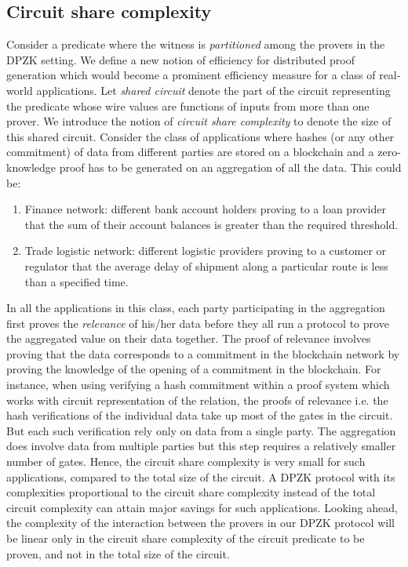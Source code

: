 \subsection{Circuit share complexity}
Consider a predicate where the witness is \textit{partitioned} among the provers in the DPZK setting. We define a new notion of efficiency for distributed proof generation which would become a prominent efficiency measure for a class of real-world applications.
Let \textit{shared circuit} denote the part of the circuit representing the predicate whose wire values are functions of inputs from more than one prover. 
We introduce the notion of \textit{circuit share complexity} to denote the size of this shared circuit.
Consider the class of applications where hashes (or any other commitment) of data from different parties are stored on a blockchain and a zero-knowledge proof has to be generated on an aggregation of all the data. This could be: 
\begin{enumerate}
\item Finance network: different bank account holders proving to a loan provider that the sum of their account balances is greater than the required threshold.
\item Trade logistic network: different logistic providers proving to a customer or regulator that the average delay of shipment along a particular route is less than a specified time.
\end{enumerate}
In all the applications in this class, each party participating in the aggregation first proves the \textit{relevance} of his/her data before they all run a protocol to prove the aggregated value on their data together. The proof of relevance involves proving that the data corresponds to a commitment in the blockchain network by proving the knowledge of the opening of a commitment in the blockchain. 
For instance, when using verifying a hash commitment within a proof system which works with circuit representation of the relation, the proofs of relevance i.e. the hash verifications of the individual data take up most of the gates in the circuit. But each such verification rely only on data from a single party. The aggregation does involve data from multiple parties but this step requires a relatively smaller number of gates. Hence, the circuit share complexity is very small for such applications, compared to the total size of the circuit. A DPZK protocol with its complexities proportional to the circuit share complexity instead of the total circuit complexity can attain major savings for such applications.%
Looking ahead, the complexity of the interaction between the provers in our DPZK protocol will be linear only in the circuit share complexity of the circuit predicate to be proven, and not in the total size of the circuit. 






